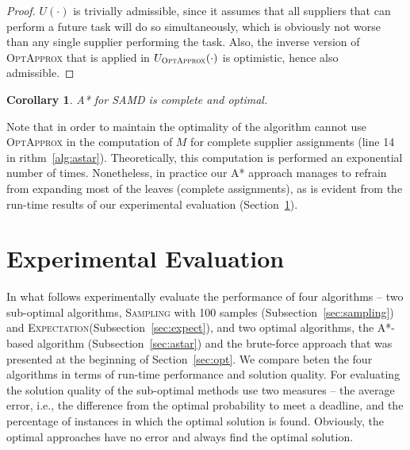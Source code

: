 \documentclass[letterpaper]{article} %
\newtheorem{corollary}{Corollary}
\newcommand{\samd}{\ac{SAMD}\xspace}
\newcommand{\astar}{\textsc{A*}\xspace}
\newcommand{\sampling}{\textsc{Sampling}\xspace}
\newcommand{\expectation}{\textsc{Expectation}\xspace}
\newcommand{\optapprox}{\textsc{OptApprox}\xspace}
\begin{document}
\begin{proof}
$U(\cdot)$ is trivially admissible, since it assumes that all suppliers that can perform a future task will do so simultaneously, which is obviously not worse than any single supplier performing the task. Also, the inverse version of \optapprox that is applied in $U_{\optapprox}(\cdot)$ is optimistic, hence also admissible.
\end{proof}

\begin{corollary}
\astar for \samd is complete and optimal.
\end{corollary}

Note that in order to maintain the optimality of the algorithm  cannot use \optapprox in the computation of $M$ for complete supplier assignments (line 14 in rithm~\ref{alg:astar}). Theoretically, this computation is performed an exponential number of times. Nonetheless, in practice our \astar approach manages to refrain from expanding most of the leaves (complete assignments), as is evident from the run-time results of our experimental evaluation (Section~\ref{sec:exp}).




\section{Experimental Evaluation}
\label{sec:exp}

In what follows  experimentally evaluate the performance of four algorithms -- two sub-optimal algorithms, \sampling with 100 samples (Subsection~\ref{sec:sampling}) and \expectation (Subsection~\ref{sec:expect}), and two optimal algorithms, the \astar-based algorithm (Subsection~\ref{sec:astar}) and the brute-force approach that was presented at the beginning of Section~\ref{sec:opt}.
We compare beten the four algorithms in terms of run-time performance and solution quality. For evaluating the solution quality of the sub-optimal methods  use two measures -- the average error, i.e., the difference from the optimal probability to meet a deadline, and the percentage of instances in which the optimal solution is found. Obviously, the optimal approaches have no error and always find the optimal solution.
\end{document}
